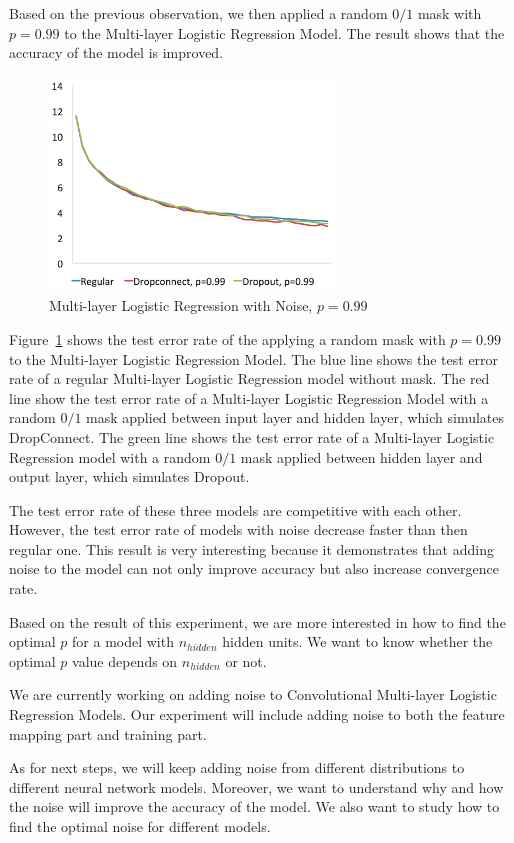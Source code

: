 Based on the previous observation, we then applied a random $0/1$ mask
with $p=0.99$ to the Multi-layer Logistic Regression Model. The result
shows that the accuracy of the model is improved.

\begin{figure}[h]
\centering
\includegraphics[width=215pt]{figs/mlp_pbig.png}
\caption{Multi-layer Logistic Regression with Noise, $p=0.99$}
\label{fig:mlp-noise-pbig}
\end{figure}

Figure~\ref{fig:mlp-noise-pbig} shows the test error rate of the
applying a random mask with $p=0.99$ to the Multi-layer Logistic
Regression Model.
The blue line shows the test error rate of a regular Multi-layer Logistic
Regression model without mask.
The red line show the test error rate of a Multi-layer Logistic Regression
Model with a random $0/1$ mask applied between input layer and hidden
layer, which simulates DropConnect.
The green line shows the test error rate of a Multi-layer Logistic
Regression model with a random $0/1$ mask applied between hidden layer and
output layer, which simulates Dropout.

The test error rate of these three models are competitive with each other.
However, the test error rate of models with noise decrease faster than
then regular one. This result is very interesting because it demonstrates
that adding noise to the model can not only improve accuracy but also
increase convergence rate.

Based on the result of this experiment, we are more interested in how to
find the optimal $p$ for a model with $n_{hidden}$ hidden units. We want to
know whether the optimal $p$ value depends on $n_{hidden}$ or not.

We are currently working on adding noise to Convolutional Multi-layer
Logistic Regression Models. Our experiment will include adding noise to
both the feature mapping part and training part.

As for next steps, we will keep adding noise from different
distributions to different neural network models.
Moreover, we want to understand why and how the noise will improve the
accuracy of the model. We also want to study how to find the optimal
noise for different models.

